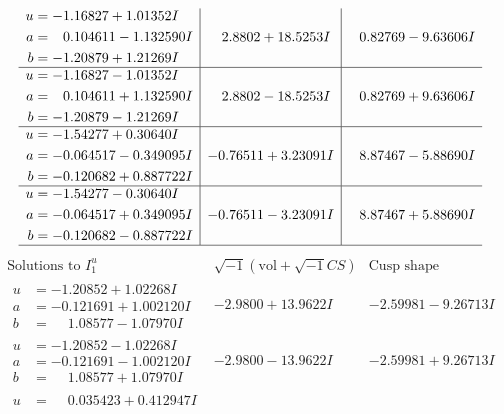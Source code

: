 \documentclass[1p]{elsarticle_modified}
\theoremstyle{definition}
\newcommand{\I}{\sqrt{-1}}
\begin{document}
$$\begin{array}{c|c|c}
\begin{aligned}
u &= -1.16827 + 1.01352 I \\
a &= \phantom{-}0.104611 - 1.132590 I \\
b &= -1.20879 + 1.21269 I\end{aligned}
 & \phantom{-}2.8802 + 18.5253 I & \phantom{-}0.82769 - 9.63606 I \\ \hline\begin{aligned}
u &= -1.16827 - 1.01352 I \\
a &= \phantom{-}0.104611 + 1.132590 I \\
b &= -1.20879 - 1.21269 I\end{aligned}
 & \phantom{-}2.8802 - 18.5253 I & \phantom{-}0.82769 + 9.63606 I \\ \hline\begin{aligned}
u &= -1.54277 + 0.30640 I \\
a &= -0.064517 - 0.349095 I \\
b &= -0.120682 + 0.887722 I\end{aligned}
 & -0.76511 + 3.23091 I & \phantom{-}8.87467 - 5.88690 I \\ \hline\begin{aligned}
u &= -1.54277 - 0.30640 I \\
a &= -0.064517 + 0.349095 I \\
b &= -0.120682 - 0.887722 I\end{aligned}
 & -0.76511 - 3.23091 I & \phantom{-}8.87467 + 5.88690 I\\
 \hline 
 \end{array}$$\newpage$$\begin{array}{c|c|c}  
\text{Solutions to }I^u_{1}& \I (\text{vol} + \sqrt{-1}CS) & \text{Cusp shape}\\
 \hline 
\begin{aligned}
u &= -1.20852 + 1.02268 I \\
a &= -0.121691 + 1.002120 I \\
b &= \phantom{-}1.08577 - 1.07970 I\end{aligned}
 & -2.9800 + 13.9622 I & -2.59981 - 9.26713 I \\ \hline\begin{aligned}
u &= -1.20852 - 1.02268 I \\
a &= -0.121691 - 1.002120 I \\
b &= \phantom{-}1.08577 + 1.07970 I\end{aligned}
 & -2.9800 - 13.9622 I & -2.59981 + 9.26713 I \\ \hline\begin{aligned}
u &= \phantom{-}0.035423 + 0.412947 I \\

\end{aligned}
\end{array}$$
\end{document}
